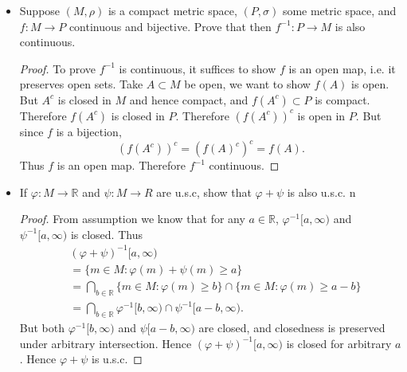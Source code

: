 \begin{itemize}
\item Suppose $\left( M, \rho \right) $ is a compact metric space, $\left( P, \sigma \right) $ some metric space, and $f: M \to  P$ continuous and bijective. Prove that then $f^{-1} :P \to  M$ is also continuous.
\begin{proof}
	To prove $f^{-1}$ is continuous, it suffices to show $f$ is an open map, i.e. it preserves open sets. Take $A \subset M$ be open, we want to show $f(A)$ is open. But $A^c$ is closed in $M$ and hence compact, and $f(A^c) \subset P$ is compact. Therefore $f(A^c)$ is closed in $P$. Therefore $\left( f(A^c) \right)^c $ is open in $P$. But since $f$ is a bijection,
	\[
		\left( f(A^c) \right) ^c = \left( f(A)^c \right) ^c = f(A)
	.\] 
	Thus $f$ is an open map. Therefore $f^{-1}$ continuous.
\end{proof}

\item If $\varphi: M \to  \mathbb{R}$ and $\psi : M \to  R$ are u.s.c, show that $\varphi + \psi$ is also u.s.c.
n
\begin{proof}
	From assumption we know that for any $a \in \mathbb{R}$, $\varphi^{-1} [a, \infty )$ and $\psi^{-1} [a,\infty)$ is closed. Thus
	\begin{align*}
		&(\varphi+\psi)^{-1} [a, \infty )\\
		&= \{m \in M: \varphi(m) + \psi(m) \ge a\}  \\
		&= \bigcap_{b \in \mathbb{R}} \{m \in M: \varphi(m) \ge b\} \cap \{m \in M: \varphi(m) \ge a-b\}  \\
		&= \bigcap_{b \in \mathbb{R}} \varphi^{-1} [b,\infty ) \cap \psi^{-1} [a-b, \infty )
	.\end{align*} 
	But both $\varphi^{-1} [b,\infty )$ and $\psi[a-b, \infty )$ are closed, and closedness is preserved under arbitrary intersection. Hence $(\varphi + \psi)^{-1}[a, \infty )$ is closed for arbitrary $a$. Hence $\varphi + \psi$ is u.s.c.
\end{proof}

\end{itemize}
